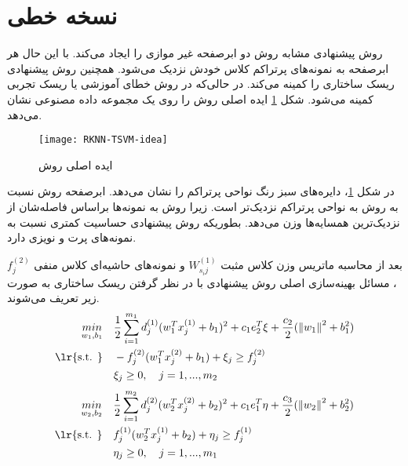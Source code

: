 \section{نسخه خطی}\label{sec:4:4}
روش پیشنهادی مشابه روش  دو ابرصفحه غیر موازی را ایجاد می‌کند. با این حال هر ابرصفحه به نمونه‌های پرتراکم کلاس خودش نزدیک می‌شود. همچنین روش پیشنهادی ریسک ساختاری را کمینه می‌کند. در حالی‌که در روش  خطای آموزشی یا ریسک تجربی کمینه می‌شود. شکل  \ref{fig:RKNN-TSVM} ایده اصلی روش  را روی یک مجموعه داده مصنوعی نشان می‌دهد.
\begin{figure}[!b]
	\centering
	\texttt{[image: RKNN-TSVM-idea]}
	\caption{ ایده اصلی روش }
	\label{fig:RKNN-TSVM}
\end{figure}

در شکل ‏\ref{fig:RKNN-TSVM}، دایره‌های سبز رنگ نواحی پرتراکم را نشان می‌دهد. ابرصفحه روش  نسبت به روش  به نواحی پرتراکم نزدیک‌تر است. زیرا روش  به نمونه‌ها براساس فاصله‌شان از نزدیک‌ترین همسایه‌ها وزن می‌دهد. بطوریکه روش پیشنهادی حساسیت کمتری نسبت به نمونه‌های پرت و نویزی دارد.

بعد از محاسبه ماتریس وزن کلاس مثبت  $W^{(1)}_{s_ij}$ و نمونه‌های حاشیه‌ای کلاس منفی  $f^{(2)}_{j}$، مسائل بهینه‌سازی اصلی روش پیشنهادی با در نظر گرفتن ریسک ساختاری به صورت زیر تعریف می‌شوند.
\begin{equation}
\label{eq:4:11}
\begin{split}
\mathop{{ min}}\limits_{w_{1} ,b_{1}} \quad & \frac{1}{2}\sum\limits_{i=1}^{m_{1}}{d^{(1)}_{j}(w^{T}_{1}x^{(1)}_{j}+b_{1})^{2}}+c_{1}e_{2}^{T}\xi+\frac{c_{2}}{2}(\left\|w_{1}\right\|^{2}+b^{2}_{1}) \\
\textrm{\lr{s.t. }} \quad & -f^{(2)}_{j}(w^{T}_{1}x^{(2)}_{j}+b_{1})+\xi_{j} \ge f^{(2)}_{j} \\
& \xi_{j} \ge 0,\quad j=1,...,m_{2}
\end{split}
\end{equation}
\begin{equation}
\label{eq:4:12}
\begin{split}
\mathop{{ min}}\limits_{w_{2} ,b_{2}} \quad & \frac{1}{2}\sum\limits_{i=1}^{m_{2}}{d^{(2)}_{j}(w^{T}_{2}x^{(2)}_{j}+b_{2})^{2}}+c_{1}e_{1}^{T}\eta+\frac{c_{3}}{2}(\left\|w_{2}\right\|^{2}+b^{2}_{2}) \\
\textrm{\lr{s.t. }} \quad & f^{(1)}_{j}(w^{T}_{2}x^{(1)}_{j}+b_{2})+\eta_{j} \ge f^{(1)}_{j} \\
& \eta_{j} \ge 0,\quad j=1,...,m_{1}
\end{split}
\end{equation}

